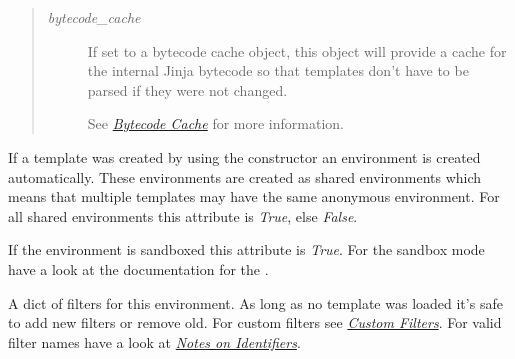 \documentclass[a4paper,10pt,english]{sphinxmanual}
\begin{document}
\begin{fulllineitems}
\begin{quote}
\begin{description}
\item[{\emph{bytecode\_cache}}] \leavevmode
If set to a bytecode cache object, this object will provide a
cache for the internal Jinja bytecode so that templates don't
have to be parsed if they were not changed.

See {\hyperref[api:bytecode-cache]{\emph{Bytecode Cache}}} for more information.

\end{description}
\end{quote}

\begin{fulllineitems}
\label{api:jinja2.Environment.shared}
If a template was created by using the {\hyperref[api:jinja2.Template]{}} constructor
an environment is created automatically.  These environments are
created as shared environments which means that multiple templates
may have the same anonymous environment.  For all shared environments
this attribute is \emph{True}, else \emph{False}.

\end{fulllineitems}


\begin{fulllineitems}
\label{api:jinja2.Environment.sandboxed}
If the environment is sandboxed this attribute is \emph{True}.  For the
sandbox mode have a look at the documentation for the
{\hyperref[sandbox:jinja2.sandbox.SandboxedEnvironment]{}}.

\end{fulllineitems}


\begin{fulllineitems}
\label{api:jinja2.Environment.filters}
A dict of filters for this environment.  As long as no template was
loaded it's safe to add new filters or remove old.  For custom filters
see {\hyperref[api:writing-filters]{\emph{Custom Filters}}}.  For valid filter names have a look at
{\hyperref[api:identifier-naming]{\emph{Notes on Identifiers}}}.

\end{fulllineitems}



\end{fulllineitems}
\end{document}
